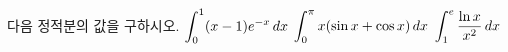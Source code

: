 다음 정적분의 값을 구하시오.
 $\displaystyle\int_{0}^{1}(x-1)e^{-x}\mkern3mu dx$
 $\displaystyle\int_{0}^{\pi}x(\sin x+\cos x)\mkern3mu dx$
 $\displaystyle\int_{1}^{e}\dfrac{\ln x}{x^2}\mkern3mu dx$
